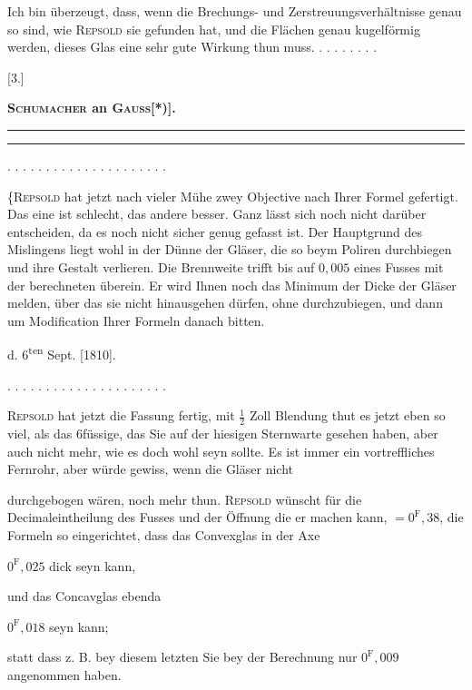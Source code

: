 Ich bin überzeugt, dass, wenn die Brechungs- und Zerstreuungsverhältnisse genau so sind, wie \textsc{Repsold} sie gefunden hat, und die Flächen genau kugelförmig werden, dieses Glas eine sehr gute Wirkung thun muss. . . . . . . . .
\bigskip\begin{center}
[3.]\par\medskip
\textbf{\textsc{Schumacher} an \textsc{Gauss}[*)].}\par\medskip
\rule{.75\linewidth}{.4pt}\par
[Briefwechsel zwischen \textsc{Gauss} und \textsc{Schumacher} I, S. 52.]\par
\rule{.75\linewidth}{.4pt}
\end{center}
\begingroup\renewcommand{\thefootnote}{}\endgroup
\noindent . . . . . . . . . . . . . . . . . . . . .\par
\noindent\hspace*{\parindent}\{\textsc{Repsold} hat jetzt nach vieler Mühe zwey Objective nach Ihrer Formel gefertigt. Das eine ist schlecht, das andere besser. Ganz lässt sich noch nicht darüber entscheiden, da es noch nicht sicher genug gefasst ist. Der Hauptgrund des Mislingens liegt wohl in der Dünne der Gläser, die so beym Poliren durchbiegen und ihre Gestalt verlieren. Die Brennweite trifft bis auf $0{,}005$ eines Fusses mit der berechneten überein. Er wird Ihnen noch das Minimum der Dicke der Gläser melden, über das sie nicht hinausgehen dürfen, ohne durchzubiegen, und dann um Modification Ihrer Formeln danach bitten.
\begin{flushright}d. 6\textsuperscript{ten} Sept. [1810].\end{flushright}
\noindent . . . . . . . . . . . . . . . . . . . . .\par
\noindent\hspace*{\parindent}\textsc{Repsold} hat jetzt die Fassung fertig, mit $\frac12$ Zoll Blendung thut es jetzt eben so viel, als das 6füssige, das Sie auf der hiesigen Sternwarte gesehen haben, aber auch nicht mehr, wie es doch wohl seyn sollte. Es ist immer ein vortreffliches Fernrohr, aber würde gewiss, wenn die Gläser nicht
\par\HistoricalFoot{}{19\textsuperscript{*}}
\clearpage{}
\noindent durchgebogen wären, noch mehr thun. \textsc{Repsold} wünscht für die Decimaleintheilung des Fusses und der Öffnung die er machen kann, $=0^{\mathrm F}{,}38$, die Formeln so eingerichtet, dass das Convexglas in der Axe
\begin{center}$0^{\mathrm F}{,}025$ dick seyn kann,\end{center}
\noindent und das Concavglas ebenda
\begin{center}$0^{\mathrm F}{,}018$ seyn kann;\end{center}
\noindent statt dass z. B. bey diesem letzten Sie bey der Berechnung nur $0^{\mathrm F}{,}009$ angenommen haben.

